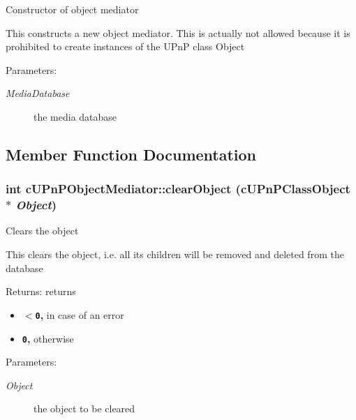 Constructor of object mediator

This constructs a new object mediator. This is actually not allowed because it is prohibited to create instances of the UPnP class Object \begin{Desc}
\item[Parameters:]
\begin{description}
\item[{\em MediaDatabase}]the media database \end{description}
\end{Desc}


\subsection{Member Function Documentation}
\hypertarget{classcUPnPObjectMediator_9ab720e86c6d6cb397799ac5070f70aa}{
\subsubsection[{clearObject}]{\setlength{\rightskip}{0pt plus 5cm}int cUPnPObjectMediator::clearObject ({\bf cUPnPClassObject} $\ast$ {\em Object})}}
\label{classcUPnPObjectMediator_9ab720e86c6d6cb397799ac5070f70aa}


Clears the object

This clears the object, i.e. all its children will be removed and deleted from the database

\begin{Desc}
\item[Returns:]returns\begin{itemize}
\item {\bf {\tt $<$0},} in case of an error\item {\bf {\tt 0},} otherwise \end{itemize}
\end{Desc}
\begin{Desc}
\item[Parameters:]
\begin{description}
\item[{\em Object}]the object to be cleared \end{description}
\end{Desc}
 

